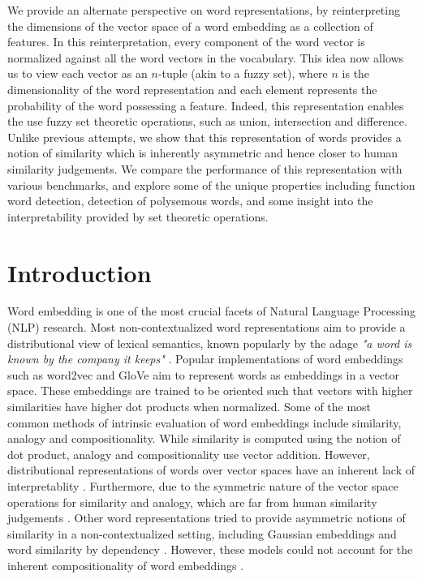 \documentclass[11pt]{book}
\newcommand{\citep}[1]{\cite{#1}}
\begin{document}
We provide an alternate perspective on word representations, by
reinterpreting the dimensions of the vector space of a word embedding as a
collection of features. In this reinterpretation, every component of the word
vector is normalized against all the word vectors in the vocabulary. This idea
now allows us to view each vector as an $n$-tuple (akin to a fuzzy set), where
$n$ is the dimensionality of the word representation and each element
represents the probability of the word possessing a feature. Indeed, this
representation enables the use fuzzy set theoretic operations, such as union,
intersection and difference. Unlike previous attempts, we show that this
representation of words provides a notion of similarity which is inherently
asymmetric and hence closer to human similarity judgements. We compare the
performance of this representation with various benchmarks, and explore some of
the unique properties including function word detection, detection of
polysemous words, and some insight into the interpretability provided by set
theoretic operations.

\section{Introduction} \label{sec: intro}

Word embedding is one of the most crucial facets of Natural Language Processing
(NLP) research. Most non-contextualized word representations aim to provide a
distributional view of lexical semantics, known popularly by the adage
\textit{"a word is known by the company it keeps"} \citep{firth1957synopsis}.
Popular implementations of word embeddings such as word2vec
\citep{mikolov2013efficient} and GloVe \citep{pennington2014glove} aim to
represent words as embeddings in a vector space. These embeddings are trained
to be oriented such that vectors with higher similarities have higher dot
products when normalized. Some of the most common methods of intrinsic
evaluation of word embeddings include similarity, analogy and compositionality.
While similarity is computed using the notion of dot product, analogy and
compositionality use vector addition.
However, distributional representations of words over vector spaces have an
inherent lack of interpretablity \citep{goldberg2014word2vec}. Furthermore, due
to the symmetric nature of the vector space operations for similarity and
analogy, which are far from human similarity judgements
\citep{tversky1977features}. Other word representations tried to provide
asymmetric notions of similarity in a non-contextualized setting, including
Gaussian embeddings \citep{vilnis2014word} and word similarity by dependency
\citep{gawron2014improving}. However, these models could not account for the
inherent compositionality of word embeddings \citep{mikolov2013distributed}.
\end{document}
